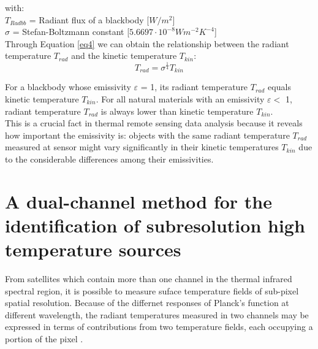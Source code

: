 \noindent with:\\
\indent $T_{Radbb}$ = Radiant flux of a blackbody [$W/m^2$]\\
\indent $\sigma$ = Stefan-Boltzmann constant [$5.6697 \cdot 10^{-8} W m^{-2} K^{-4}$]\\

\noindent Through Equation \eqref{eq4} we can obtain the relationship between the radiant temperature $T_{rad}$ and the kinetic temperature $T_{kin}$:\\
\begin{equation}
\label{eq5}
T_{rad} = \sigma ^{\frac{1}{4}} T_{kin}
\end{equation}

\noindent For a blackbody whose emissivity $\varepsilon$ = 1, its radiant temperature $T_{rad}$ equals kinetic temperature $T_{kin}$. For all natural materials with an emissivity $\varepsilon <$ 1, radiant temperature $T_{rad}$ is always lower than kinetic temperature $T_{kin}$.\\

\noindent This is a crucial fact in thermal remote sensing data analysis because it reveals how important the emissivity is: objects with the same radiant temperature $T_{rad}$ measured at sensor might vary significantly in their kinetic temperatures $T_{kin}$ due to the considerable differences among their emissivities.\\


\section{A dual-channel method for the identification of subresolution high temperature sources}
From satellites which contain more than one channel in the thermal infrared spectral region, it is possible to measure suface temperature fields of sub-pixel spatial resolution. Because of the differnet responses of Planck's function at different wavelength, the radiant temperatures measured in two channels may be expressed in terms of contributions from two temperature fields, each occupying a portion of the pixel \parencite{Reference210, Reference211}.\\

